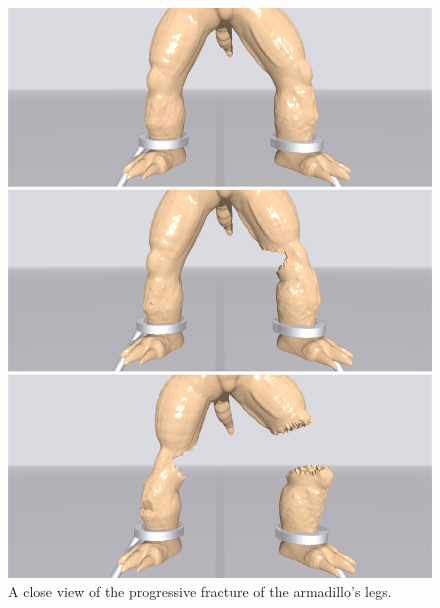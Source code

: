 \begin{figure}[t]
  \centering
  \includegraphics[width=\linewidth]{../figs/demo_tear_armadillo_close_view.png}
  \caption{\label{fig:17}
  A close view of the progressive fracture of the armadillo's legs.
}
\end{figure}

%





